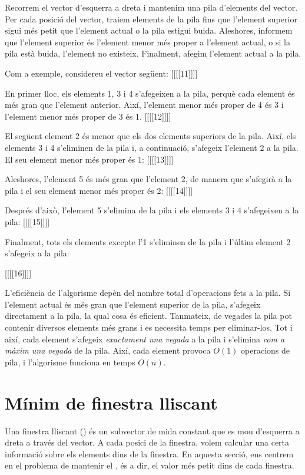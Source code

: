 Recorrem el vector d'esquerra a dreta i mantenim una pila d'elements
del vector. Per cada posició del vector, traiem elements de la pila
fins que l'element superior sigui més petit que l'element actual o la
pila estigui buida. Aleshores, informem que l'element superior és
l'element menor més proper a l'element actual, o si la pila està
buida, l'element no existeix. Finalment, afegim l'element actual a la
pila.

Com a exemple, considereu el vector següent:
[[[[11]]]]


En primer lloc, els elements 1, 3 i 4 s'afegeixen a la pila, perquè
cada element és més gran que l'element anterior. Així, l'element menor
més proper de 4 és 3 i l'element menor més proper de 3 és 1.
[[[[12]]]]


El següent element 2 és menor que els dos elements superiors de la
pila. Així, els elements 3 i 4 s'eliminen de la pila i, a continuació,
s'afegeix l'element 2 a la pila. El seu element menor més proper
és 1:
[[[[13]]]]


Aleshores, l'element 5 és més gran que l'element 2, de manera que
s'afegirà a la pila i el seu element menor més proper és 2:
[[[[14]]]]


Després d'això, l'element 5 s'elimina de la pila i els elements 3 i 4
s'afegeixen a la pila:
[[[[15]]]]


Finalment, tots els elements excepte l'1 s'eliminen de la pila i
l'últim element 2 s'afegeix a la pila:


[[[[16]]]]


L'eficiència de l'algorisme depèn del nombre total d'operacions fets a
la pila. Si l'element actual és més gran que l'element superior de la
pila, s'afegeix directament a la pila, la qual cosa és
eficient. Tanmateix, de vegades la pila pot contenir diversos elements
més grans i es necessita temps per eliminar-los. Tot i així, cada
element s'afegeix \emph{exactament una vegada} a la pila i s'elimina
\emph{com a màxim una vegada} de la pila. Així, cada element provoca
$O(1)$ operacions de pila, i l'algorisme funciona en temps $O(n)$.

\section{Mínim de finestra lliscant}

 

Una finestra lliscant () és un subvector de mida
constant que es mou d'esquerra a dreta a través del vector. A cada
posici de la finestra, volem calcular una certa informació sobre els
elements dins de la finestra. En aquesta secció, ens centrem en el
problema de mantenir el , és a dir, el valor
més petit dins de cada finestra.

